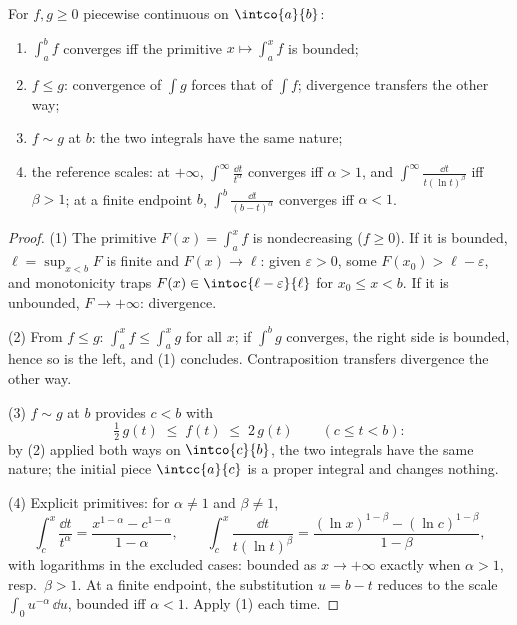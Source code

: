 \begin{theorem}\label{thm:b2:integration:comparison}
For $f, g \geq 0$ piecewise continuous on $\intco{a}{b}$:
\begin{enumerate}
  \item $\int_a^b f$ converges iff the primitive $x \mapsto \int_a^x
        f$ is bounded;
  \item $f \leq g$: convergence of $\int g$ forces that of $\int f$;
        divergence transfers the other way;
  \item $f \sim g$ at $b$: the two integrals have the same nature;
  \item the reference scales: at $+\infty$, $\int^{\infty}
        \frac{\dd t}{t^\alpha}$ converges iff $\alpha > 1$, and
        $\int^\infty \frac{\dd t}{t(\ln t)^\beta}$ iff $\beta > 1$;
        at a finite endpoint $b$, $\int^b \frac{\dd t}{(b -
        t)^\alpha}$ converges iff $\alpha < 1$.
\end{enumerate}
\end{theorem}

\begin{proof}
(1) The primitive $F(x) = \int_a^x f$ is nondecreasing ($f \geq
0$). If it is bounded, $\ell = \sup_{x < b}F$ is finite and
$F(x) \to \ell$: given $\varepsilon > 0$, some $F(x_0) > \ell -
\varepsilon$, and monotonicity traps $F(x) \in
\intoc{\ell - \varepsilon}{\ell}$ for $x_0 \leq x < b$. If it is
unbounded, $F \to +\infty$: divergence.

(2) From $f \leq g$: $\int_a^x f \leq \int_a^x g$ for all $x$;
if $\int^b g$ converges, the right side is bounded, hence so is
the left, and (1) concludes. Contraposition transfers divergence
the other way.

(3) $f \sim g$ at $b$ provides $c < b$ with
\[
\tfrac12\,g(t) \;\leq\; f(t) \;\leq\; 2\,g(t)
\qquad (c \leq t < b) :
\]
by (2) applied both ways on $\intco{c}{b}$, the two integrals
have the same nature; the initial piece $\intcc{a}{c}$ is a
proper integral and changes nothing.

(4) Explicit primitives: for $\alpha \neq 1$ and $\beta \neq 1$,
\[
\int_c^x \frac{\dd t}{t^\alpha}
= \frac{x^{1-\alpha} - c^{1-\alpha}}{1 - \alpha},
\qquad
\int_c^x \frac{\dd t}{t(\ln t)^\beta}
= \frac{(\ln x)^{1-\beta} - (\ln c)^{1-\beta}}{1 - \beta},
\]
with logarithms in the excluded cases: bounded as $x \to
+\infty$ exactly when $\alpha > 1$, resp.\ $\beta > 1$. At a
finite endpoint, the substitution $u = b - t$ reduces to the
scale $\int_0 u^{-\alpha}\,\dd u$, bounded iff $\alpha < 1$.
Apply (1) each time.
\end{proof}

